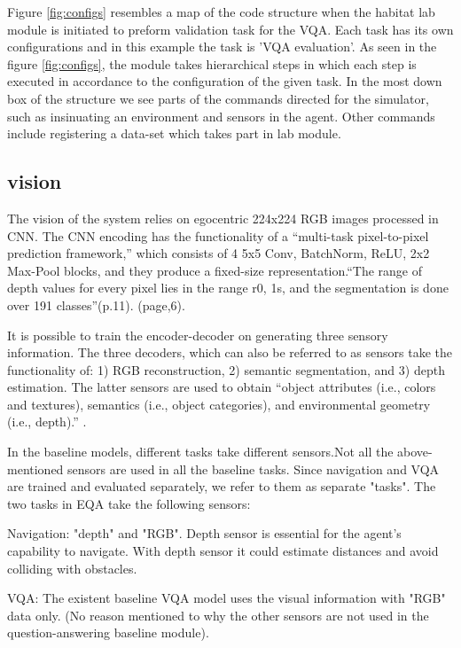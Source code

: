 Figure \ref{fig:configs} resembles a map of the code structure when the habitat lab module is initiated to preform validation task for the VQA. Each task has its own configurations and in this example the task is 'VQA evaluation'. As seen in the figure \ref{fig:configs}, the module takes hierarchical steps in which each step is executed in accordance to the configuration of the given task. In the most down box of the structure we see parts of the commands directed for the simulator, such as insinuating an environment and sensors in the agent. Other commands include registering a data-set which takes part in lab module. 

\subsection{vision}

The vision of the system relies on egocentric 224x224 RGB images processed in CNN. The CNN encoding has the functionality of a “multi-task pixel-to-pixel prediction framework,” which consists of 4 {5x5 Conv, BatchNorm, ReLU, 2x2 Max-Pool blocks}, and they produce a fixed-size representation.“The range of depth values for every pixel lies in the range r0, 1s, and the segmentation is done over 191 classes”(p.11). (page,6). 

It  is possible to train the encoder-decoder on generating  three sensory information. The three decoders, which can also be referred to as sensors take the functionality of: 1) RGB reconstruction, 2) semantic segmentation, and 3) depth estimation. The latter sensors are used to obtain “object attributes (i.e., colors and textures), semantics (i.e., object categories), and environmental geometry (i.e., depth).” . 

In the baseline models, different tasks take different sensors.Not all the above-mentioned sensors are used in all the baseline tasks. Since navigation and VQA are trained and evaluated separately, we refer to them as separate "tasks". The two tasks in EQA take the following sensors: 

{Navigation}:  "depth" and "RGB". Depth sensor is essential for the agent's capability to navigate. With depth sensor it could estimate distances and avoid colliding with obstacles.  

{VQA}: The existent baseline VQA model uses the visual information with "RGB" data only. (No reason mentioned to why the other sensors are not used in the question-answering baseline module).  



